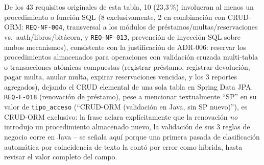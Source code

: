 De los 43 requisitos originales de esta tabla, 10 (23{,}3\,\%) involucran al menos un
procedimiento o función SQL (8 exclusivamente, 2 en combinación con
CRUD-ORM: \texttt{REQ-NF-004}, transversal a los módulos de
préstamos/multas/reservaciones vs.\ auth/libros/bitácora, y
\texttt{REQ-NF-013}, prevención de inyección SQL sobre ambos
mecanismos), consistente con la justificación de ADR-006: reservar los
procedimientos almacenados para operaciones con validación cruzada
multi-tabla o transacciones atómicas compuestas (registrar préstamo,
registrar devolución, pagar multa, anular multa, expirar reservaciones
vencidas, y los 3 reportes agregados), dejando el CRUD elemental de una
sola tabla en Spring Data JPA. \texttt{REQ-F-018} (renovación de
préstamo), pese a mencionar textualmente ``SP'' en su valor de
\texttt{tipo\_acceso} (``CRUD-ORM (validación en Java, sin SP nuevo)''),
es CRUD-ORM exclusivo: la frase aclara explícitamente que la renovación
\emph{no} introdujo un procedimiento almacenado nuevo, la validación de
sus 3 reglas de negocio corre en Java -- se señala aquí porque una
primera pasada de clasificación automática por coincidencia de texto
la contó por error como híbrida, hasta revisar el valor completo del
campo.
